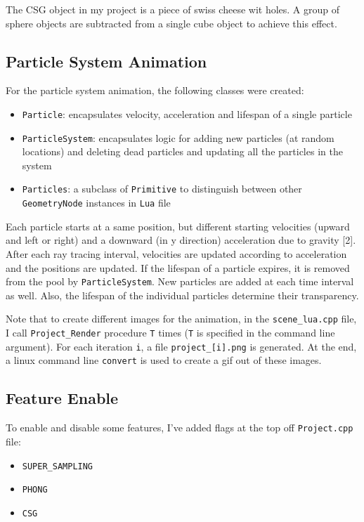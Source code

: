 \documentclass{article}
\begin{document}
The CSG object in my project is a piece of swiss cheese wit holes. A group of sphere objects are subtracted from a single cube object to achieve this effect.

\subsection{Particle System Animation}
For the particle system animation, the following classes were created:
\begin{itemize}
  \item \texttt{Particle}: encapsulates velocity, acceleration and lifespan of a single particle
  \item \texttt{ParticleSystem}: encapsulates logic for adding new particles (at random locations) and deleting dead particles and updating all the particles in the system
  \item \texttt{Particles}: a subclass of \texttt{Primitive} to distinguish between other \texttt{GeometryNode} instances in \texttt{Lua} file
\end{itemize}

Each particle starts at a same position, but different starting velocities (upward and left or right) and a downward (in y direction) acceleration due to gravity [2]. After each ray tracing interval, velocities are updated according to acceleration and the positions are updated. If the lifespan of a particle expires, it is removed from the pool by \texttt{ParticleSystem}. New particles are added at each time interval as well. Also, the lifespan of the individual particles determine their transparency.

Note that to create different images for the animation, in the \texttt{scene\_lua.cpp} file, I call \texttt{Project\_Render} procedure \texttt{T} times (\texttt{T} is specified in the command line argument). For each iteration \texttt{i}, a file \texttt{project\_[i].png} is generated. At the end, a linux command line \texttt{convert} is used to create a gif out of these images.

\subsection{Feature Enable}
To enable and disable some features, I've added flags at the top off \texttt{Project.cpp} file:
\begin{itemize}
  \item \texttt{SUPER\_SAMPLING}
  \item \texttt{PHONG}
  \item \texttt{CSG}
\end{itemize}
\end{document}
